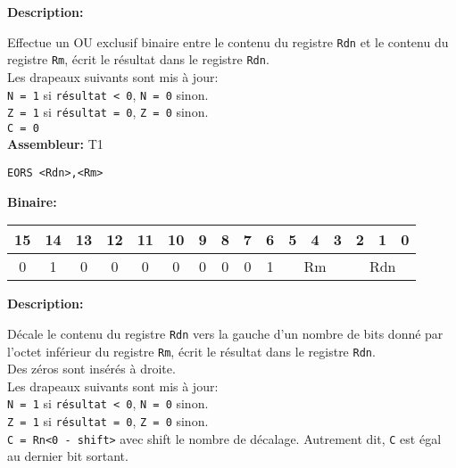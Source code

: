 \documentclass{article}
\begin{document}

    \textbf{Description: }

    Effectue un OU exclusif binaire entre le contenu du registre \texttt{Rdn} et le contenu du registre \texttt{Rm}, écrit le résultat dans le registre \texttt{Rdn}.\\
    Les drapeaux suivants sont mis à jour:\\
    \texttt{N = 1} si \texttt{résultat < 0}, \texttt{N = 0} sinon.\\
    \texttt{Z = 1} si \texttt{résultat = 0}, \texttt{Z = 0} sinon.\\
    \texttt{C = 0}\\

    \textbf{Assembleur:} T1

    \begin{lstlisting}
EORS <Rdn>,<Rm>
    \end{lstlisting}

    \textbf{Binaire:}\\

    \begin{tabular}{| c c c c c c c c c c c c c c c c |}
        \hline
        15 & 14 & 13 & 12 & 11 & 10 & \multicolumn{1}{|c}{9} & 8 & 7 & 6 & \multicolumn{1}{|c}{5} & 4 & 3 & \multicolumn{1}{|c}{2} & 1 & 0 \\
        \hline
        0 & 1 & 0 & 0 & 0 & 0 & \multicolumn{1}{|c}{0} & 0 & 0 & 1 & \multicolumn{3}{|c}{Rm} & \multicolumn{3}{|c|}{Rdn} \\
        \hline
    \end{tabular}



    \textbf{Description: }

    Décale le contenu du registre \texttt{Rdn} vers la gauche d'un nombre de bits donné par l'octet inférieur du registre \texttt{Rm}, écrit le résultat dans le registre \texttt{Rdn}.\\
    Des zéros sont insérés à droite.\\
    Les drapeaux suivants sont mis à jour:\\
    \texttt{N = 1} si \texttt{résultat < 0}, \texttt{N = 0} sinon.\\
    \texttt{Z = 1} si \texttt{résultat = 0}, \texttt{Z = 0} sinon.\\
    \texttt{C = Rn<0 - shift>} avec shift le nombre de décalage.
    Autrement dit, \texttt{C} est égal au dernier bit sortant.\\
\end{document}
